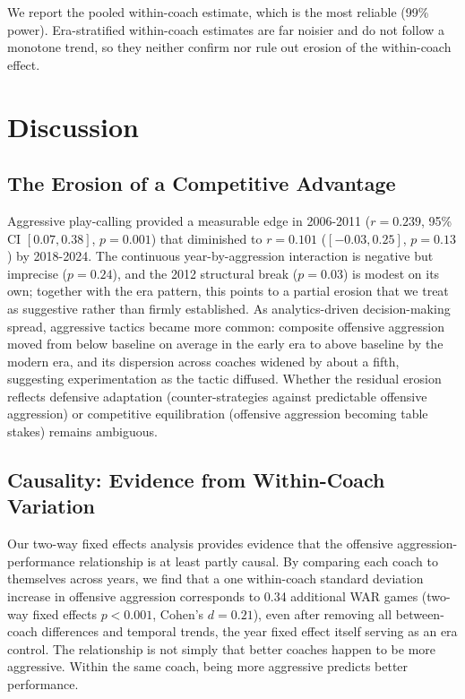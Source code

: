 \documentclass[USenglish]{article}
\theoremstyle{dgthm}
\theoremstyle{dgdef}
\begin{document}
We report the pooled within-coach estimate, which is the most reliable (99\% power). Era-stratified within-coach estimates are far noisier and do not follow a monotone trend, so they neither confirm nor rule out erosion of the within-coach effect.



\section{Discussion}

\subsection{The Erosion of a Competitive Advantage}

Aggressive play-calling provided a measurable edge in 2006-2011 ($r=0.239$, 95\% CI $[0.07, 0.38]$, $p=0.001$) that diminished to $r=0.101$ ($[-0.03, 0.25]$, $p=0.13$) by 2018-2024. The continuous year-by-aggression interaction is negative but imprecise ($p=0.24$), and the 2012 structural break ($p=0.03$) is modest on its own; together with the era pattern, this points to a partial erosion that we treat as suggestive rather than firmly established. As analytics-driven decision-making spread, aggressive tactics became more common: composite offensive aggression moved from below baseline on average in the early era to above baseline by the modern era, and its dispersion across coaches widened by about a fifth, suggesting experimentation as the tactic diffused. Whether the residual erosion reflects defensive adaptation (counter-strategies against predictable offensive aggression) or competitive equilibration (offensive aggression becoming table stakes) remains ambiguous.

\subsection{Causality: Evidence from Within-Coach Variation}

Our two-way fixed effects analysis provides evidence that the offensive aggression-performance relationship is at least partly causal. By comparing each coach to themselves across years, we find that a one within-coach standard deviation increase in offensive aggression corresponds to 0.34 additional WAR games (two-way fixed effects $p<0.001$, Cohen's $d=0.21$), even after removing all between-coach differences and temporal trends, the year fixed effect itself serving as an era control. The relationship is not simply that better coaches happen to be more aggressive. Within the same coach, being more aggressive predicts better performance.
\end{document}
